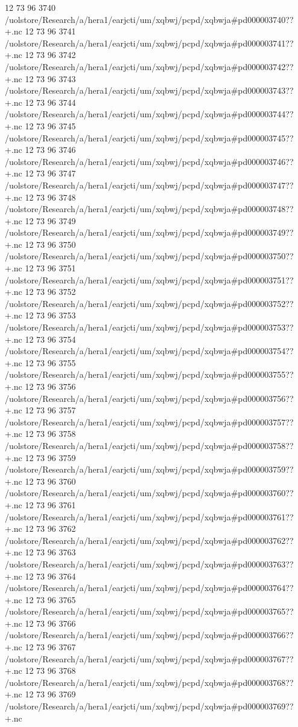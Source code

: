 12 73 96
3740
/uolstore/Research/a/hera1/earjcti/um/xqbwj/pcpd/xqbwja#pd000003740??+.nc
12 73 96
3741
/uolstore/Research/a/hera1/earjcti/um/xqbwj/pcpd/xqbwja#pd000003741??+.nc
12 73 96
3742
/uolstore/Research/a/hera1/earjcti/um/xqbwj/pcpd/xqbwja#pd000003742??+.nc
12 73 96
3743
/uolstore/Research/a/hera1/earjcti/um/xqbwj/pcpd/xqbwja#pd000003743??+.nc
12 73 96
3744
/uolstore/Research/a/hera1/earjcti/um/xqbwj/pcpd/xqbwja#pd000003744??+.nc
12 73 96
3745
/uolstore/Research/a/hera1/earjcti/um/xqbwj/pcpd/xqbwja#pd000003745??+.nc
12 73 96
3746
/uolstore/Research/a/hera1/earjcti/um/xqbwj/pcpd/xqbwja#pd000003746??+.nc
12 73 96
3747
/uolstore/Research/a/hera1/earjcti/um/xqbwj/pcpd/xqbwja#pd000003747??+.nc
12 73 96
3748
/uolstore/Research/a/hera1/earjcti/um/xqbwj/pcpd/xqbwja#pd000003748??+.nc
12 73 96
3749
/uolstore/Research/a/hera1/earjcti/um/xqbwj/pcpd/xqbwja#pd000003749??+.nc
12 73 96
3750
/uolstore/Research/a/hera1/earjcti/um/xqbwj/pcpd/xqbwja#pd000003750??+.nc
12 73 96
3751
/uolstore/Research/a/hera1/earjcti/um/xqbwj/pcpd/xqbwja#pd000003751??+.nc
12 73 96
3752
/uolstore/Research/a/hera1/earjcti/um/xqbwj/pcpd/xqbwja#pd000003752??+.nc
12 73 96
3753
/uolstore/Research/a/hera1/earjcti/um/xqbwj/pcpd/xqbwja#pd000003753??+.nc
12 73 96
3754
/uolstore/Research/a/hera1/earjcti/um/xqbwj/pcpd/xqbwja#pd000003754??+.nc
12 73 96
3755
/uolstore/Research/a/hera1/earjcti/um/xqbwj/pcpd/xqbwja#pd000003755??+.nc
12 73 96
3756
/uolstore/Research/a/hera1/earjcti/um/xqbwj/pcpd/xqbwja#pd000003756??+.nc
12 73 96
3757
/uolstore/Research/a/hera1/earjcti/um/xqbwj/pcpd/xqbwja#pd000003757??+.nc
12 73 96
3758
/uolstore/Research/a/hera1/earjcti/um/xqbwj/pcpd/xqbwja#pd000003758??+.nc
12 73 96
3759
/uolstore/Research/a/hera1/earjcti/um/xqbwj/pcpd/xqbwja#pd000003759??+.nc
12 73 96
3760
/uolstore/Research/a/hera1/earjcti/um/xqbwj/pcpd/xqbwja#pd000003760??+.nc
12 73 96
3761
/uolstore/Research/a/hera1/earjcti/um/xqbwj/pcpd/xqbwja#pd000003761??+.nc
12 73 96
3762
/uolstore/Research/a/hera1/earjcti/um/xqbwj/pcpd/xqbwja#pd000003762??+.nc
12 73 96
3763
/uolstore/Research/a/hera1/earjcti/um/xqbwj/pcpd/xqbwja#pd000003763??+.nc
12 73 96
3764
/uolstore/Research/a/hera1/earjcti/um/xqbwj/pcpd/xqbwja#pd000003764??+.nc
12 73 96
3765
/uolstore/Research/a/hera1/earjcti/um/xqbwj/pcpd/xqbwja#pd000003765??+.nc
12 73 96
3766
/uolstore/Research/a/hera1/earjcti/um/xqbwj/pcpd/xqbwja#pd000003766??+.nc
12 73 96
3767
/uolstore/Research/a/hera1/earjcti/um/xqbwj/pcpd/xqbwja#pd000003767??+.nc
12 73 96
3768
/uolstore/Research/a/hera1/earjcti/um/xqbwj/pcpd/xqbwja#pd000003768??+.nc
12 73 96
3769
/uolstore/Research/a/hera1/earjcti/um/xqbwj/pcpd/xqbwja#pd000003769??+.nc
